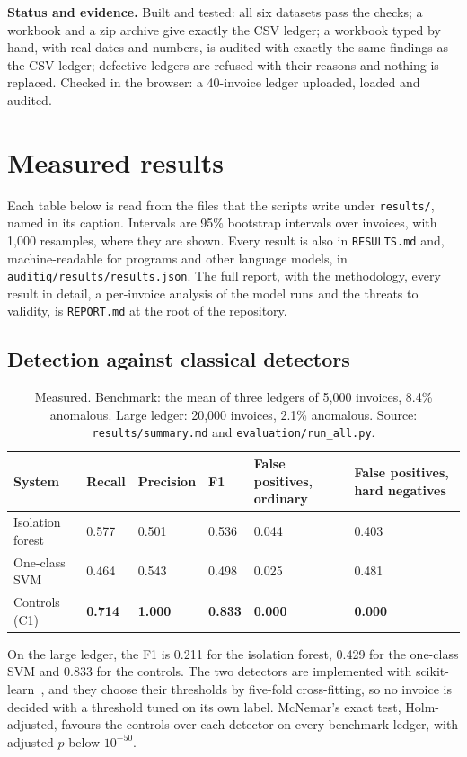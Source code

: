 \documentclass[11pt,a4paper]{article}
\begin{document}
\textbf{Status and evidence.} Built and tested: all six datasets pass the checks; a workbook and a zip archive give exactly the CSV ledger; a workbook typed by hand, with real dates and numbers, is audited with exactly the same findings as the CSV ledger; defective ledgers are refused with their reasons and nothing is replaced. Checked in the browser: a 40-invoice ledger uploaded, loaded and audited.

\section{Measured results}
\label{sec:measured}
Each table below is read from the files that the scripts write under \texttt{results/}, named in its caption. Intervals are 95\% bootstrap intervals over invoices, with 1,000 resamples, where they are shown. Every result is also in \texttt{RESULTS.md} and, machine-readable for programs and other language models, in \texttt{auditiq/\allowbreak results/\allowbreak results.json}. The full report, with the methodology, every result in detail, a per-invoice analysis of the model runs and the threats to validity, is \texttt{REPORT.md} at the root of the repository.

\subsection{Detection against classical detectors}
\begin{table}[htbp]
\caption{Measured. Benchmark: the mean of three ledgers of 5,000 invoices, 8.4\% anomalous. Large ledger: 20,000 invoices, 2.1\% anomalous. Source: \texttt{results/summary.md} and \texttt{evaluation/run\_all.py}.}
\label{tab:detect}
\centering
\small
\begin{tabular}{L{3.2cm}R{2.1cm}R{2.1cm}R{2.1cm}R{2.1cm}R{2.1cm}}
\toprule
System & Recall & Precision & F1 & False positives, ordinary & False positives, hard negatives \\
\midrule
Isolation forest~\cite{liu2008} & 0.577 & 0.501 & 0.536 & 0.044 & 0.403 \\
One-class SVM~\cite{scholkopf2001} & 0.464 & 0.543 & 0.498 & 0.025 & 0.481 \\
Controls (C1) & \textbf{0.714} & \textbf{1.000} & \textbf{0.833} & \textbf{0.000} & \textbf{0.000} \\
\bottomrule
\end{tabular}
\end{table}

On the large ledger, the F1 is 0.211 for the isolation forest, 0.429 for the one-class SVM and 0.833 for the controls. The two detectors are implemented with scikit-learn~\cite{pedregosa2011}, and they choose their thresholds by five-fold cross-fitting, so no invoice is decided with a threshold tuned on its own label. McNemar's exact test, Holm-adjusted, favours the controls over each detector on every benchmark ledger, with adjusted $p$ below $10^{-50}$.
\end{document}
